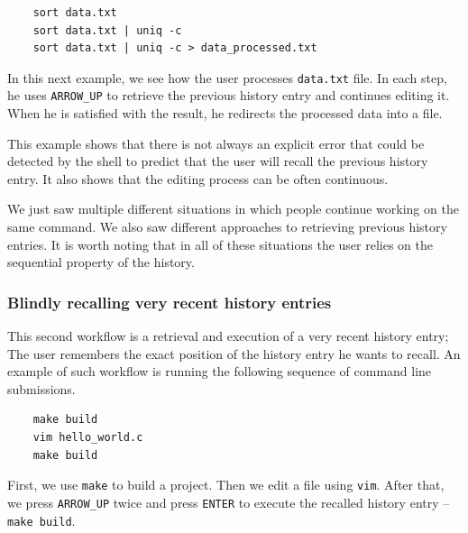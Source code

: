 \documentclass[thesis=M,english]{FITthesis}[2012/10/20]
\newcommand{\todotext}[1]{\textcolor{red}{\textbf{[[#1]]}}}
\newcommand{\redtext}[1]{\textcolor{red}{[[#1]]}}
\begin{document}
\begin{verbatim}
    sort data.txt
    sort data.txt | uniq -c
    sort data.txt | uniq -c > data_processed.txt
\end{verbatim}

In this next example, we see how the user processes \verb|data.txt| file. In each step, he uses \verb|ARROW_UP| to retrieve the previous history entry and continues editing it. When he is satisfied with the result, he redirects the processed data into a file. 

This example shows that there is not always an explicit error that could be detected by the shell to predict that the user will recall the previous history entry. It also shows that the editing process can be often continuous.

We just saw multiple different situations in which people continue working on the same command. We also saw different approaches to retrieving previous history entries. It is worth noting that in all of these situations the user relies on the sequential property of the history. 




\subsubsection*{Blindly recalling very recent history entries}

This second workflow is a retrieval and execution of a very recent history entry; The user remembers the exact position of the history entry he wants to recall. An example of such workflow is running the following sequence of command line submissions.
\begin{verbatim}
    make build
    vim hello_world.c
    make build
\end{verbatim}
First, we use \verb|make| to build a project. Then we edit a file using \verb|vim|. After that, we press \verb|ARROW_UP| twice and press \verb|ENTER| to execute the recalled history entry -- \verb|make build|. 
\end{document}
